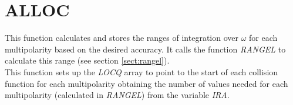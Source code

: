 \section{ALLOC}
\label{sect:alloc}

\noindent This function calculates and stores the ranges of integration over
$\omega$ for each multipolarity based on the desired accuracy. It calls the
function {\em RANGEL} to calculate this range (see section
\ref{sect:rangel}).\\

\noindent This function sets up the {\em LOCQ} array to point to the start
of each collision function for each multipolarity obtaining the number of
values needed for each multipolarity (calculated in {\em RANGEL}) from the
variable {\em IRA}.\\

